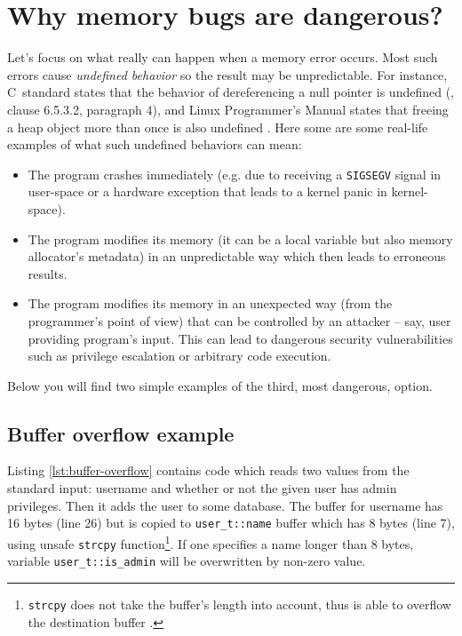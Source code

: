 \documentclass[shortabstract, manyadvisors, english, mgr]{iithesis}
\theoremstyle{definition} \newtheorem*{definition}{Definicja}
\theoremstyle{definition} \newtheorem*{example}{Przykład}
\theoremstyle{definition} \newtheorem*{remark}{Uwaga}
\begin{document}
\section{Why memory bugs are dangerous?}
Let's focus on what really can happen when a memory error occurs. Most such errors cause \textit{undefined behavior} \cite{bib:undefined-behavior} so the result may be unpredictable. For instance, C~standard states that the behavior of dereferencing a null pointer is undefined (\cite{bib:nullptr-ub}, clause 6.5.3.2, paragraph 4), and Linux Programmer's Manual states that freeing a heap object more than once is also undefined \cite{bib:double-free-ub}. Here some are some real-life examples of what such undefined behaviors can mean:
\begin{itemize}
    \item The program crashes immediately (e.g. due to receiving a \texttt{SIGSEGV} signal in user-space or a hardware exception that leads to a kernel panic in kernel-space).
    \item The program modifies its memory (it can be a local variable but also memory allocator's metadata) in an unpredictable way which then leads to erroneous results.
    \item The program modifies its memory in an unexpected way (from the programmer's point of view) that can be controlled by an attacker -- say, user providing program's input. This can lead to dangerous security vulnerabilities such as privilege escalation or arbitrary code execution.
\end{itemize}

Below you will find two simple examples of the third, most dangerous, option.

\subsection{Buffer overflow example}

Listing \ref{lst:buffer-overflow} contains code which reads two values from the standard input: username and whether or not the given user has admin privileges. Then it adds the user to some database. The buffer for username has 16 bytes (line 26) but is copied to \texttt{user\_t::name} buffer which has 8 bytes (line 7), using unsafe \texttt{strcpy} function\footnote{\texttt{strcpy} does not take the buffer's length into account, thus is able to overflow the destination buffer \cite{bib:strcpy}.}. If one specifies a name longer than 8 bytes, variable \texttt{user\_t::is\_admin} will be overwritten by non-zero value.
\end{document}
